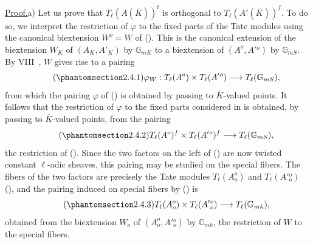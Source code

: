 \smallskip
\noindent
\underline{Proof.}\quad a) Let us prove that
$T_\ell(A(\overline K))^t$ is orthogonal to
$T_\ell(A'(\overline K))^f$.  To do so, we interpret the restriction of
$\varphi$ to the fixed parts of the Tate modules using the canonical
biextension $W^o=W$ of ().  This is the canonical extension of the
biextension $W_K$ of $(A_K,A'_K)$ by $\mathbb G_{mK}$ to a biextension
of $(A^o,A'{}^o)$ by $\mathbb G_{mS}$.  By VIII~, $W$ gives rise to
a pairing
\begin{equation}\tag{\SGARefTarget{sga7.sga7i.eix.n2-4-1}{2.4.1}}
 \varphi_W:T_\ell(A^o)\times T_\ell(A'{}^o)
 \longrightarrow T_\ell(\mathbb G_{mS}),
\end{equation}
from which the pairing $\varphi$ of () is obtained by passing to
$\overline K$-valued points.  It follows that the restriction of
$\varphi$ to the fixed parts considered in  is obtained, by passing
to $\overline K$-valued points, from the pairing
\begin{equation}\tag{\SGARefTarget{sga7.sga7i.eix.n2-4-2}{2.4.2}}
 T_\ell(A^o)^f\times T_\ell(A'{}^o)^f
 \longrightarrow T_\ell(\mathbb G_{mS}),
\end{equation}
the restriction of ().  Since the two factors on the left of
() are now twisted constant $\ell$-adic sheaves, this pairing may
be studied on the special fibers.  The fibers of the two factors are
precisely the Tate modules $T_\ell(A_o^o)$ and
$T_\ell(A'{}_o^o)$ (), and the pairing induced on special fibers
by () is
\begin{equation}\tag{\SGARefTarget{sga7.sga7i.eix.n2-4-3}{2.4.3}}
 T_\ell(A_o^o)\times T_\ell(A'{}_o^o)
 \longrightarrow T_\ell(\mathbb G_{mk}),
\end{equation}
obtained from the biextension $W_o$ of $(A_o^o,A'{}_o^o)$ by
$\mathbb G_{mk}$, the restriction of $W$ to the special fibers.


